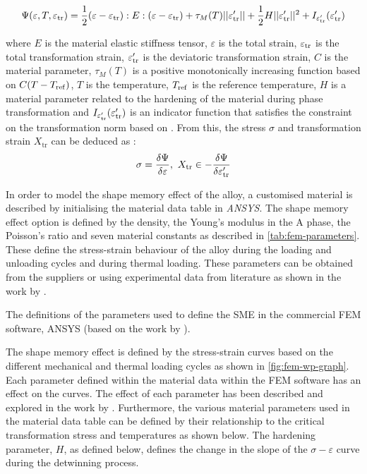 \begin{equation}
    \label{eq:fem-free-energy}
    \Psi(\varepsilon,T,\varepsilon_\mathrm{tr})=\frac{1}{2}(\varepsilon-\varepsilon_\mathrm{tr}):E:(\varepsilon-\varepsilon_\mathrm{tr})+\tau_M(T)||\varepsilon'_\mathrm{tr}||+\frac{1}{2}H||\varepsilon'_\mathrm{tr}||^2+I_{\varepsilon'_\mathrm{tr}}(\varepsilon'_\mathrm{tr})
\end{equation}

where $E$ is the material elastic stiffness tensor, $\varepsilon$ is the total strain, $\varepsilon_\mathrm{tr}$ is the total transformation strain, $\varepsilon'_\mathrm{tr}$ is the deviatoric transformation strain, $C$ is the material parameter, $\tau_M(T)$ is a positive monotonically increasing function based on $C(T-T_\mathrm{ref})$, $T$ is the temperature, $T_\mathrm{ref}$ is the reference temperature, $H$ is a material parameter related to the hardening of the material during phase transformation and $I_{\varepsilon'_\mathrm{tr}}(\varepsilon'_\mathrm{tr})$ is an indicator function that satisfies the constraint on the transformation norm based on \cite{auricchioImprovementsAlgorithmicalConsiderations2002}. From this, the stress $\sigma$ and transformation strain $X_\mathrm{tr}$ can be deduced as :
\begin{equation}
    \label{eq:fem-stress-transf-stress}
    \sigma = \frac{\delta\Psi}{\delta\varepsilon},~X_\mathrm{tr}\in-\frac{\delta\Psi}{\delta\varepsilon'_\mathrm{tr}}
\end{equation}

In order to model the shape memory effect of the alloy, a customised material is described by initialising the material data table in \textit{ANSYS}. The shape memory effect option is defined by the density, the Young's modulus in the A phase, the Poisson's ratio and seven material constants as described in \cref{tab:fem-parameters}. These define the stress-strain behaviour of the alloy during the loading and unloading cycles and during thermal loading. These parameters can be obtained from the suppliers or using experimental data from literature as shown in the work by \cite{malagisiCoupledNormalshearStress2017}.

\begin{table}[hbt]
    \centering
    \caption[The definitions of the parameters used to define the SME in the commercial FEM software, ANSYS]{The definitions of the parameters used to define the SME in the commercial FEM software, ANSYS (based on the work by \cite{jaberAnsysParametersShape2018}).}
    \label{tab:fem-parameters}
    
\end{table}

The shape memory effect is defined by the stress-strain curves based on the different mechanical and thermal loading cycles as shown in \cref{fig:fem-wp-graph}. Each parameter defined within the material data within the FEM software has an effect on the curves. The effect of each parameter has been described and explored in the work by \cite{jaberAnsysParametersShape2018}. Furthermore, the various material parameters used in the material data table can be defined by their relationship to the critical transformation stress and temperatures as shown below. The hardening parameter, $H$, as defined below, defines the change in the slope of the $\sigma-\varepsilon$ curve during the detwinning process.

